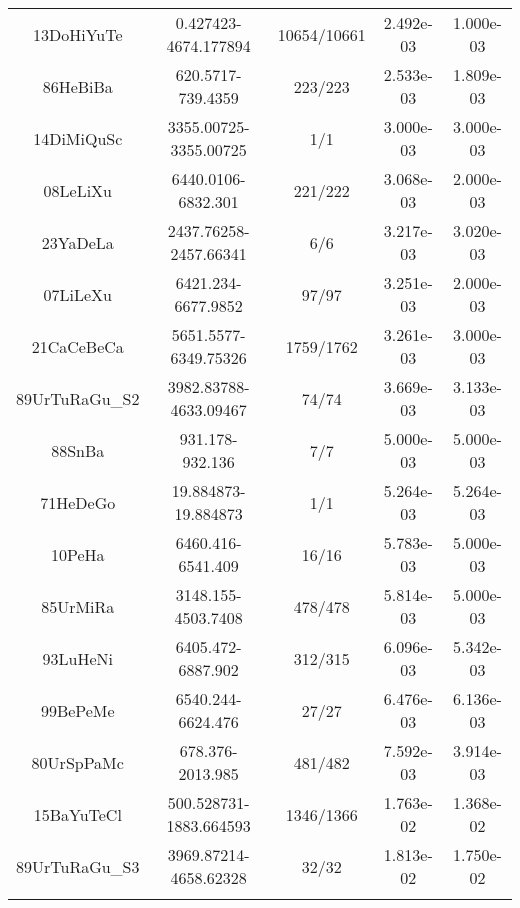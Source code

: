 \begin{longtable}{c c c c c}
13DoHiYuTe \cite{13DoHiYuTe.NH3} & 0.427423-4674.177894 & 10654/10661 & 2.492e-03 & 1.000e-03 \\
86HeBiBa \cite{86HeBiBa.NH3} & 620.5717-739.4359 & 223/223 & 2.533e-03 & 1.809e-03 \\
14DiMiQuSc \cite{14DiMiQuSc.NH3} & 3355.00725-3355.00725 & 1/1 & 3.000e-03 & 3.000e-03 \\
08LeLiXu \cite{08LeLiXu.NH3} & 6440.0106-6832.301 & 221/222 & 3.068e-03 & 2.000e-03 \\
23YaDeLa \cite{23YaDeLa.NH3} & 2437.76258-2457.66341 & 6/6 & 3.217e-03 & 3.020e-03 \\
07LiLeXu \cite{07LiLeXu.NH3} & 6421.234-6677.9852 & 97/97 & 3.251e-03 & 2.000e-03 \\
21CaCeBeCa \cite{21CaCeBeCa.NH3} & 5651.5577-6349.75326 & 1759/1762 & 3.261e-03 & 3.000e-03 \\
89UrTuRaGu_S2 \cite{89UrTuRaGu_S2.NH3} & 3982.83788-4633.09467 & 74/74 & 3.669e-03 & 3.133e-03 \\
88SnBa \cite{88SnBa.NH3} & 931.178-932.136 & 7/7 & 5.000e-03 & 5.000e-03 \\
71HeDeGo \cite{71HeDeGo.NH3} & 19.884873-19.884873 & 1/1 & 5.264e-03 & 5.264e-03 \\
10PeHa \cite{10PeHa.NH3} & 6460.416-6541.409 & 16/16 & 5.783e-03 & 5.000e-03 \\
85UrMiRa \cite{85UrMiRa.NH3} & 3148.155-4503.7408 & 478/478 & 5.814e-03 & 5.000e-03 \\
93LuHeNi \cite{93LuHeNi.NH3} & 6405.472-6887.902 & 312/315 & 6.096e-03 & 5.342e-03 \\
99BePeMe \cite{99BePeMe.NH3} & 6540.244-6624.476 & 27/27 & 6.476e-03 & 6.136e-03 \\
80UrSpPaMc \cite{80UrSpPaMc.NH3} & 678.376-2013.985 & 481/482 & 7.592e-03 & 3.914e-03 \\
15BaYuTeCl \cite{15BaYuTeCl.NH3} & 500.528731-1883.664593 & 1346/1366 & 1.763e-02 & 1.368e-02 \\
89UrTuRaGu_S3 \cite{89UrTuRaGu_S3.NH3} & 3969.87214-4658.62328 & 32/32 & 1.813e-02 & 1.750e-02 \\
\hline
\caption{}
\end{longtable}